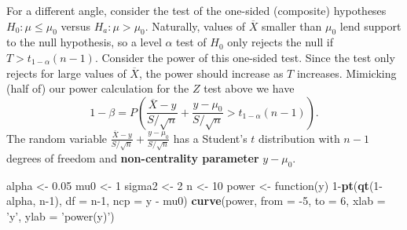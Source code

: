\documentclass[]{book}
\newenvironment{Shaded}{\begin{snugshade}}{\end{snugshade}}
\newcommand{\KeywordTok}[1]{\textcolor[rgb]{0.13,0.29,0.53}{\textbf{{#1}}}}
\newcommand{\DataTypeTok}[1]{\textcolor[rgb]{0.13,0.29,0.53}{{#1}}}
\newcommand{\DecValTok}[1]{\textcolor[rgb]{0.00,0.00,0.81}{{#1}}}
\newcommand{\FloatTok}[1]{\textcolor[rgb]{0.00,0.00,0.81}{{#1}}}
\newcommand{\StringTok}[1]{\textcolor[rgb]{0.31,0.60,0.02}{{#1}}}
\newcommand{\NormalTok}[1]{{#1}}
\begin{document}
For a different angle, consider the test of the one-sided (composite)
hypotheses \(H_0:\mu \leq \mu_0\) versus \(H_a:\mu > \mu_0\). Naturally,
values of \(\overline X\) smaller than \(\mu_0\) lend support to the
null hypothesis, so a level \(\alpha\) test of \(H_0\) only rejects the
null if \(T > t_{1-\alpha}(n-1)\). Consider the power of this one-sided
test. Since the test only rejects for large values of \(\overline X\),
the power should increase as \(T\) increases. Mimicking (half of) our
power calculation for the \(Z\) test above we have
\[1-\beta = P\left(\frac{\overline X - y}{S/\sqrt{n}} + \frac{y - \mu_0}{S/\sqrt{n}} > t_{1-\alpha}(n-1)\right).\]
The random variable
\(\frac{\overline X - y}{S/\sqrt{n}} + \frac{y - \mu_0}{S/\sqrt{n}}\)
has a Student's \(t\) distribution with \(n-1\) degrees of freedom and
\textbf{non-centrality parameter} \(y-\mu_0\).

\begin{Shaded}
\begin{Highlighting}[]
\NormalTok{alpha <-}\StringTok{ }\FloatTok{0.05}
\NormalTok{mu0 <-}\StringTok{ }\DecValTok{1}
\NormalTok{sigma2 <-}\StringTok{ }\DecValTok{2}
\NormalTok{n <-}\StringTok{ }\DecValTok{10}
\NormalTok{power <-}\StringTok{ }\NormalTok{function(y)  }\DecValTok{1}\NormalTok{-}\KeywordTok{pt}\NormalTok{(}\KeywordTok{qt}\NormalTok{(}\DecValTok{1}\NormalTok{-alpha, n}\DecValTok{-1}\NormalTok{), }\DataTypeTok{df =} \NormalTok{n}\DecValTok{-1}\NormalTok{, }\DataTypeTok{ncp =} \NormalTok{y -}\StringTok{ }\NormalTok{mu0)}
\KeywordTok{curve}\NormalTok{(power, }\DataTypeTok{from =} \NormalTok{-}\DecValTok{5}\NormalTok{, }\DataTypeTok{to =} \DecValTok{6}\NormalTok{, }\DataTypeTok{xlab =} \StringTok{'y'}\NormalTok{, }\DataTypeTok{ylab =} \StringTok{'power(y)'}\NormalTok{)  }
\end{Highlighting}
\end{Shaded}
\end{document}
